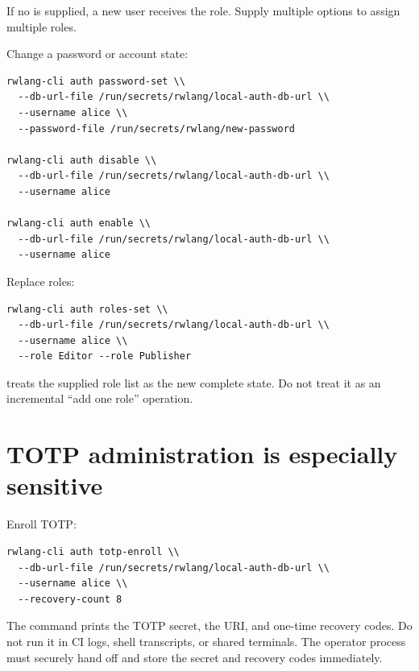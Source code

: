 If no  is supplied, a new user receives the  role. Supply multiple  options to assign multiple roles.

Change a password or account state:

\begin{lstlisting}
rwlang-cli auth password-set \\
  --db-url-file /run/secrets/rwlang/local-auth-db-url \\
  --username alice \\
  --password-file /run/secrets/rwlang/new-password

rwlang-cli auth disable \\
  --db-url-file /run/secrets/rwlang/local-auth-db-url \\
  --username alice

rwlang-cli auth enable \\
  --db-url-file /run/secrets/rwlang/local-auth-db-url \\
  --username alice
\end{lstlisting}

Replace roles:

\begin{lstlisting}
rwlang-cli auth roles-set \\
  --db-url-file /run/secrets/rwlang/local-auth-db-url \\
  --username alice \\
  --role Editor --role Publisher
\end{lstlisting}

 treats the supplied role list as the new complete state. Do not treat it as an incremental ``add one role'' operation.

\section{TOTP administration is especially sensitive}

Enroll TOTP:

\begin{lstlisting}
rwlang-cli auth totp-enroll \\
  --db-url-file /run/secrets/rwlang/local-auth-db-url \\
  --username alice \\
  --recovery-count 8
\end{lstlisting}

The command prints the TOTP secret, the  URI, and one-time recovery codes. Do not run it in CI logs, shell transcripts, or shared terminals. The operator process must securely hand off and store the secret and recovery codes immediately.


